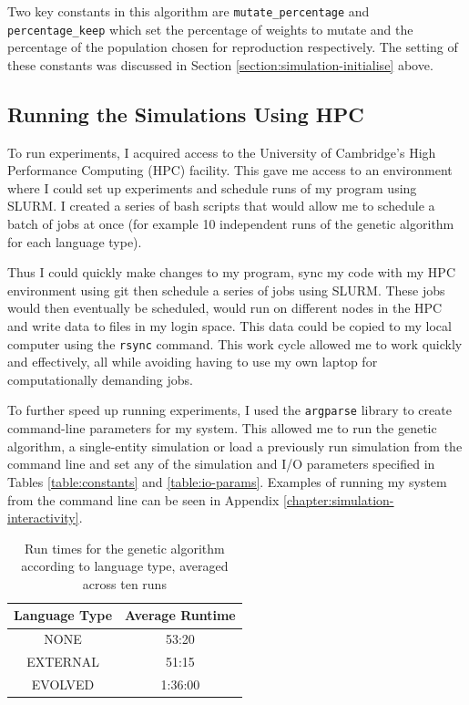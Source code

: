 \documentclass[12pt,a4paper,twoside,openright]{report}
\begin{document}
Two key constants in this algorithm are \texttt{mutate\_percentage} and \texttt{percentage\_keep} which set the percentage of weights to mutate and the percentage of the population chosen for reproduction respectively. The setting of these constants was discussed in Section \ref{section:simulation-initialise} above.

\subsection{Running the Simulations Using HPC}\label{section:running}

To run experiments, I acquired access to the University of Cambridge's High Performance Computing (HPC) facility. This gave me access to an environment where I could set up experiments and schedule runs of my program using SLURM. I created a series of bash scripts that would allow me to schedule a batch of jobs at once (for example 10 independent runs of the genetic algorithm for each language type).

Thus I could quickly make changes to my program, sync my code with my HPC environment using git then schedule a series of jobs using SLURM. These jobs would then eventually be scheduled, would run on different nodes in the HPC and write data to files in my login space. This data could be copied to my local computer using the \texttt{rsync} command. This work cycle allowed me to work quickly and effectively, all while avoiding having to use my own laptop for computationally demanding jobs. 

To further speed up running experiments, I used the \texttt{argparse} library to create command-line parameters for my system. This allowed me to run the genetic algorithm, a single-entity simulation or load a previously run simulation from the command line and set any of the simulation and I/O parameters specified in Tables \ref{table:constants} and \ref{table:io-params}. Examples of running my system from the command line can be seen in Appendix \ref{chapter:simulation-interactivity}.

\begin{table}[t]
\centering
 \begin{tabular}{ c | c}
 \bf{Language Type} & \bf{Average Runtime} \\ [0.5ex] 
 \hline
NONE & 53:20 \\
EXTERNAL & 51:15\\
EVOLVED & 1:36:00 \\
\end{tabular}
\caption{Run times for the genetic algorithm according to language type, averaged across ten runs}
\label{table:runtimes}
\end{table}
\end{document}
